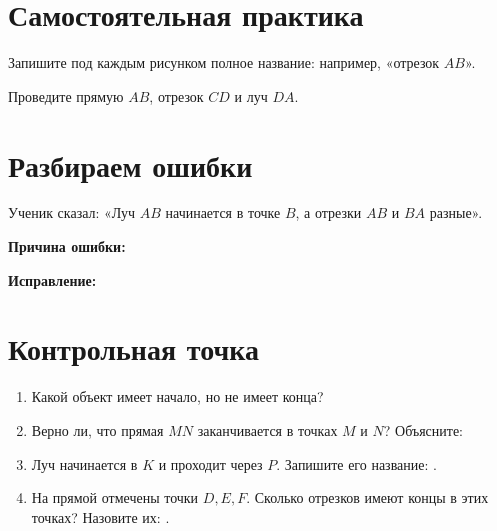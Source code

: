 \section{Самостоятельная практика}

\identifyobjectsfigure

\begin{practicebox}
  Запишите под каждым рисунком полное название: например, «отрезок $AB$».
\end{practicebox}

\begin{practicebox}
  Проведите прямую $AB$, отрезок $CD$ и луч $DA$.
  \constructionpointsfigure
\end{practicebox}

\section{Разбираем ошибки}

\begin{warningbox}
  Ученик сказал: «Луч $AB$ начинается в точке $B$, а отрезки $AB$ и
  $BA$ разные».

  \textbf{Причина ошибки:} \answerblank[100mm]

  \textbf{Исправление:} 
\end{warningbox}

\section{Контрольная точка}

\begin{checkpointbox}
  \begin{enumerate}[label=\textbf{\arabic*.}]
    \item Какой объект имеет начало, но не имеет конца? \answerblank[32mm]
    \item Верно ли, что прямая $MN$ заканчивается в точках $M$ и $N$?
      Объясните: \answerblank[80mm]
    \item Луч начинается в $K$ и проходит через $P$. Запишите его название:
      \answerblank[25mm].
    \item На прямой отмечены точки $D,E,F$. Сколько отрезков имеют концы в
      этих точках? Назовите их: \answerblank[75mm].
  \end{enumerate}
\end{checkpointbox}

